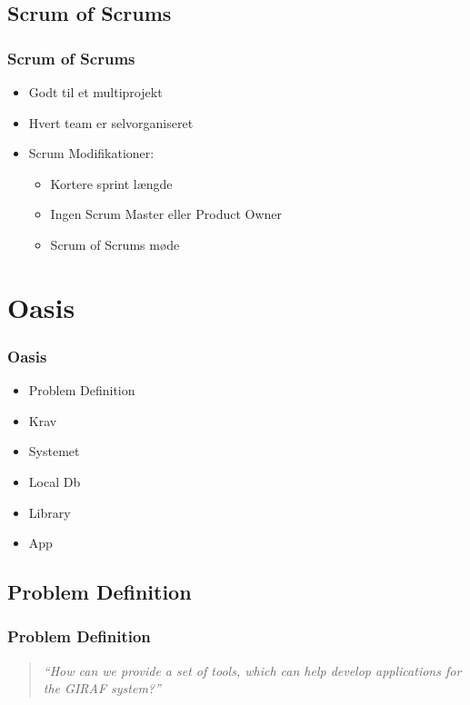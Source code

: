 \documentclass{beamer}
\begin{document}
\subsection{Scrum of Scrums}

\begin{frame}
	\frametitle{Scrum of Scrums}
	
	\begin{itemize}
		\item Godt til et multiprojekt
		\item Hvert team er selvorganiseret
		\item Scrum Modifikationer:
			\begin{itemize}
				\item Kortere sprint l\ae{}ngde
				\item Ingen Scrum Master eller Product Owner
				\item Scrum of Scrums m\o{}de 
			\end{itemize}
	\end{itemize}
\end{frame}

\section{Oasis}

\begin{frame}
	\frametitle{Oasis}
	\begin{itemize}
		\item Problem Definition
		\item Krav
		\item Systemet
		\item Local Db
		\item Library
		\item App
	\end{itemize}
\end{frame}

\subsection{Problem Definition}

\begin{frame}
	\frametitle{Problem Definition}
	
	\begin{quote}
	\textit{``How can we provide a set of tools, which can help develop applications for the GIRAF system?''}
	\end{quote}
\end{frame}
\end{document}
